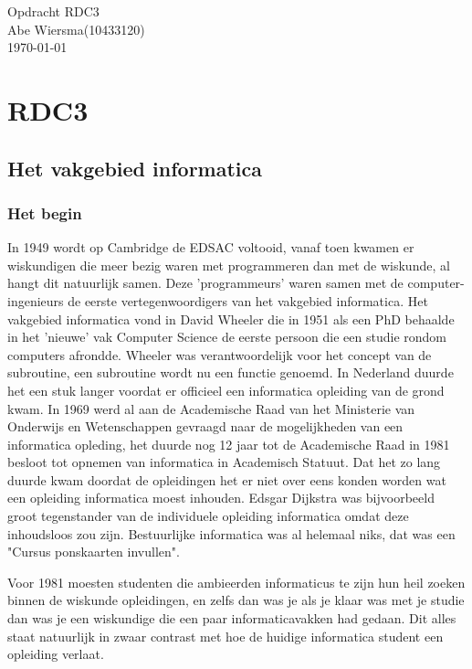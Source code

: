 \documentclass[pdftex,12pt,a4paper]{article}
\begin{document}

\noindent Opdracht RDC3\\ 
Abe Wiersma(10433120)\\
\today
\section*{RDC3}
\subsection{Het vakgebied informatica}
\subsubsection{Het begin}
In 1949 wordt op Cambridge de EDSAC voltooid, vanaf toen kwamen er wiskundigen die meer bezig waren met programmeren dan met de wiskunde, al hangt dit natuurlijk samen.
Deze 'programmeurs' waren samen met de computer-ingenieurs de eerste vertegenwoordigers van het vakgebied informatica.
Het vakgebied informatica vond in David Wheeler die in 1951 als een PhD behaalde in het 'nieuwe' vak Computer Science de eerste persoon die een studie rondom computers afrondde. Wheeler was verantwoordelijk voor het concept van de subroutine, een subroutine wordt nu een functie genoemd.
In Nederland duurde het een stuk langer voordat er officieel een informatica opleiding van de grond kwam. In 1969 werd al aan de Academische Raad van het Ministerie van Onderwijs en Wetenschappen gevraagd naar de mogelijkheden van een informatica opleding, het duurde nog 12 jaar tot de Academische Raad in 1981 besloot tot opnemen van informatica in Academisch Statuut. Dat het zo lang duurde kwam doordat de opleidingen het er niet over eens konden worden wat een opleiding informatica moest inhouden. Edsgar Dijkstra was bijvoorbeeld groot tegenstander van de individuele opleiding informatica omdat deze inhoudsloos zou zijn. Bestuurlijke informatica was al helemaal niks, dat was een "Cursus ponskaarten invullen".

Voor 1981 moesten studenten die ambieerden informaticus te zijn hun heil zoeken binnen de wiskunde opleidingen, en zelfs dan was je als je klaar was met je studie dan was je een wiskundige die een paar informaticavakken had gedaan. Dit alles staat natuurlijk in zwaar contrast met hoe de huidige informatica student een opleiding verlaat.
\end{document}
